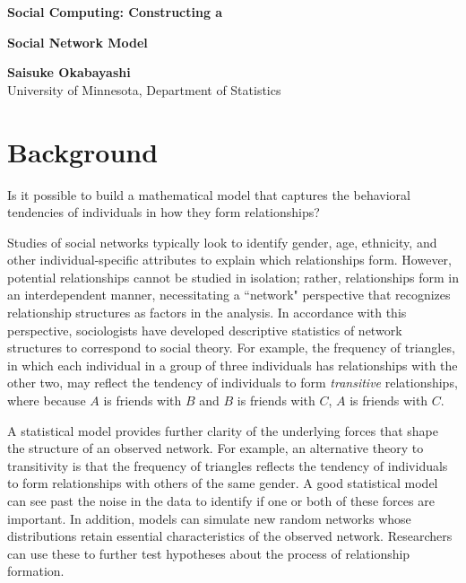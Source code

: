 \documentclass[12pt]{article}
\begin{document}
\begin{center}
{\LARGE{\textbf{Social Computing: Constructing a}}} 

\vspace*{2mm}
{\LARGE{\textbf{Social Network Model}}}

\vspace{0.25in}
{\large{\textbf{Saisuke Okabayashi}}} \\
\vspace{0.05in}
{\large{{University of Minnesota, Department of Statistics}}}\\
\end{center}


\section{Background}
Is it possible to build a mathematical model that captures the behavioral tendencies of individuals in how they form relationships?

Studies of social networks typically look to identify gender, age, ethnicity, and other individual-specific attributes to explain which relationships form.  However, potential relationships cannot be studied in isolation; rather, relationships form in an interdependent manner, necessitating a ``network" perspective that recognizes relationship structures as factors in the analysis.  
In accordance with this perspective, sociologists have developed descriptive statistics of network structures to correspond to social theory.  For example, the frequency of triangles, 
in which each individual in a group of three individuals has relationships with the other two,
may reflect the tendency of individuals to form \textit{transitive} relationships, where because $A$ is friends with $B$ and $B$ is friends with $C$, $A$ is friends with $C$.  %

A statistical model provides further clarity of the underlying forces that shape the structure of an observed network.   
For example, an alternative theory to transitivity is that the frequency of triangles reflects the tendency of individuals to form relationships with others of the same gender.  A good statistical model can see past the noise in the data to identify if one or both of these forces are important.   
In addition, models can simulate new random networks whose distributions retain essential characteristics of the observed network.  Researchers can use these to further test hypotheses about the process of relationship formation.  
\end{document}
